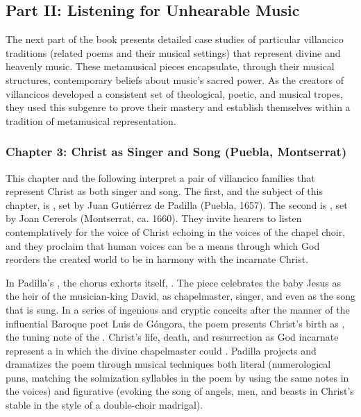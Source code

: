 \documentclass{vcbook-proposal}
\begin{document}
\subsection{Part II: Listening for Unhearable Music}

The next part of the book presents detailed case studies of particular 
villancico traditions (related poems and their musical settings) that represent 
divine and heavenly music.
These metamusical pieces encapsulate, through their musical structures, 
contemporary beliefs about music's sacred power.
As the creators of villancicos developed a consistent set of theological, 
poetic, and musical tropes, they used this subgenre to prove their mastery and 
establish themselves within a tradition of metamusical representation.

\subsubsection{Chapter 3: Christ as Singer and Song (Puebla, Montserrat)}

This chapter and the following interpret a pair of villancico families that 
represent Christ as both singer and song.
The first, and the subject of this chapter, is , set by Juan Gutiérrez de Padilla (Puebla, 1657).
The second is , set by Joan 
Cererols (Montserrat, ca. 1660).
They invite hearers to listen contemplatively for the voice of Christ echoing 
in the voices of the chapel choir, and they proclaim that human voices can be a 
means through which God reorders the created world to be in harmony with the 
incarnate Christ.

In Padilla's , the chorus exhorts itself, .
The piece celebrates the baby Jesus as the heir of the musician-king David, as 
chapelmaster, singer, and even as the song that is sung.
In a series of ingenious and cryptic conceits after the manner of the 
influential Baroque poet Luis de Góngora, the poem presents Christ's birth as 
, the tuning note of the 
.
Christ's life, death, and resurrection as God incarnate represent a 
 in which the divine chapelmaster could .
Padilla projects and dramatizes the poem through musical techniques both 
literal (numerological puns, matching the solmization syllables in the poem by 
using the same notes in the voices) and figurative (evoking the song of angels, 
men, and beasts in Christ's stable in the style of a double-choir madrigal).
\end{document}
